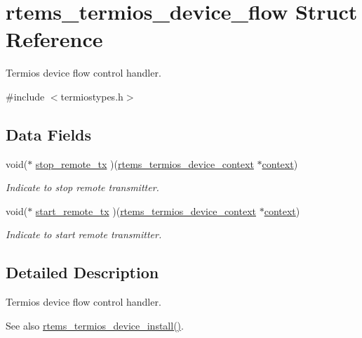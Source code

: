 \hypertarget{structrtems__termios__device__flow}{}\section{rtems\+\_\+termios\+\_\+device\+\_\+flow Struct Reference}
\label{structrtems__termios__device__flow}


Termios device flow control handler.  




{\ttfamily \#include $<$termiostypes.\+h$>$}

\subsection*{Data Fields}
\begin{DoxyCompactItemize}
\item 
void($\ast$ \mbox{\hyperlink{structrtems__termios__device__flow_a15c0be16b55cb8bec4002c36ca2eebb1}{stop\+\_\+remote\+\_\+tx}} )(\mbox{\hyperlink{structrtems__termios__device__context}{rtems\+\_\+termios\+\_\+device\+\_\+context}} $\ast$\mbox{\hyperlink{sun4u_2tte_8h_a9b4a99475e2709333b8e5d70483173f1}{context}})
\begin{DoxyCompactList}\small\item\em Indicate to stop remote transmitter. \end{DoxyCompactList}\item 
void($\ast$ \mbox{\hyperlink{structrtems__termios__device__flow_ad3f79b8dc250a47d3ca460a192df057f}{start\+\_\+remote\+\_\+tx}} )(\mbox{\hyperlink{structrtems__termios__device__context}{rtems\+\_\+termios\+\_\+device\+\_\+context}} $\ast$\mbox{\hyperlink{sun4u_2tte_8h_a9b4a99475e2709333b8e5d70483173f1}{context}})
\begin{DoxyCompactList}\small\item\em Indicate to start remote transmitter. \end{DoxyCompactList}\end{DoxyCompactItemize}


\subsection{Detailed Description}
Termios device flow control handler. 

\begin{DoxySeeAlso}{See also}
\mbox{\hyperlink{termiostypes_8h_aede46864d5d763fd7591830fefe22e1c}{rtems\+\_\+termios\+\_\+device\+\_\+install()}}. 
\end{DoxySeeAlso}



